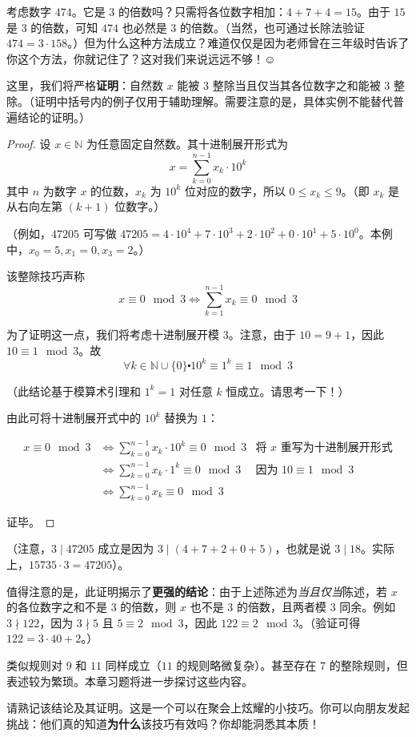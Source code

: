 \begin{example}\label{ex:example6.5.13}
    考虑数字 $474$。它是 $3$ 的倍数吗？只需将各位数字相加：$4 + 7 + 4 = 15$。由于 $15$ 是 $3$ 的倍数，可知 $474$ 也必然是 $3$ 的倍数。（当然，也可通过长除法验证 $474 = 3 \cdot 158$。）但为什么这种方法成立？难道仅仅是因为老师曾在三年级时告诉了你这个方法，你就记住了？这对我们来说远远不够！$\smiley{}$

    这里，我们将严格\textbf{证明}：自然数 $x$ 能被 $3$ 整除当且仅当其各位数字之和能被 $3$ 整除。（证明中括号内的例子仅用于辅助理解。需要注意的是，具体实例不能替代普遍结论的证明。）

    \begin{proof}
        设 $x \in \mathbb{N}$ 为任意固定自然数。其十进制展开形式为
        \[x= \sum_{k=0}^{n-1} x_k \cdot 10^k\]
        其中 $n$ 为数字 $x$ 的位数，$x_k$ 为 $10^k$ 位对应的数字，所以 $0 \le x_k \le 9$。（即 $x_k$ 是从右向左第 $(k+1)$ 位数字。）

        （例如，$47205$ 可写做 $47205=4 \cdot 10^4+7 \cdot 10^3+2 \cdot 10^2+0 \cdot 10^1+5 \cdot 10^0$。本例中，$x_0 = 5, x_1=0, x_3=2$。）

        该整除技巧声称
        \[x \equiv 0 \mod 3 \iff \sum_{k=1}^{n-1} x_k \equiv 0 \mod 3\]

        为了证明这一点，我们将考虑十进制展开模 $3$。注意，由于 $10=9+1$，因此 $10 \equiv 1 \mod 3$。故
        \[\forall k \in \mathbb{N} \cup \{0\} \centerdot 10^k \equiv 1^k \equiv 1 \mod 3\]

        （此结论基于模算术引理和 $1^k = 1$ 对任意 $k$ 恒成立。请思考一下！）

        由此可将十进制展开式中的 $10^k$ 替换为 $1$：

        \begin{align*}
            x \equiv 0 \mod 3 &\iff \sum_{k=0}^{n-1} x_k \cdot 10^k \equiv 0 \mod 3 &\text{将\ } x \text{\ 重写为十进制展开形式}\\
            &\iff \sum_{k=0}^{n-1} x_k \cdot 1^k \equiv 0 \mod 3 &\text{因为\ } 10 \equiv 1 \mod 3 \\
            &\iff \sum_{k=0}^{n-1} x_k \equiv 0 \mod 3
        \end{align*}

        证毕。
    \end{proof}

    （注意，$3 \mid 47205$ 成立是因为 $3 \mid (4 + 7 + 2 + 0 + 5)$，也就是说 $3 \mid 18$。实际上，$15735 \cdot 3 = 47205$）。

    值得注意的是，此证明揭示了\textbf{更强的结论}：由于上述陈述为\emph{当且仅当}陈述，若 $x$ 的各位数字之和不是 $3$ 的倍数，则 $x$ 也不是 $3$ 的倍数，且两者模 $3$ 同余。例如 $3 \nmid 122$，因为 $3 \nmid 5$ 且 $5 \equiv 2 \mod 3$，因此 $122 \equiv 2 \mod 3$。（验证可得 $122 = 3 \cdot 40 + 2$。）

    类似规则对 $9$ 和 $11$ 同样成立（$11$ 的规则略微复杂）。甚至存在 $7$ 的整除规则，但表述较为繁琐。本章习题将进一步探讨这些内容。

    请熟记该结论及其证明。这是一个可以在聚会上炫耀的小技巧。你可以向朋友发起挑战：他们真的知道\textbf{为什么}该技巧有效吗？你却能洞悉其本质！
\end{example}
